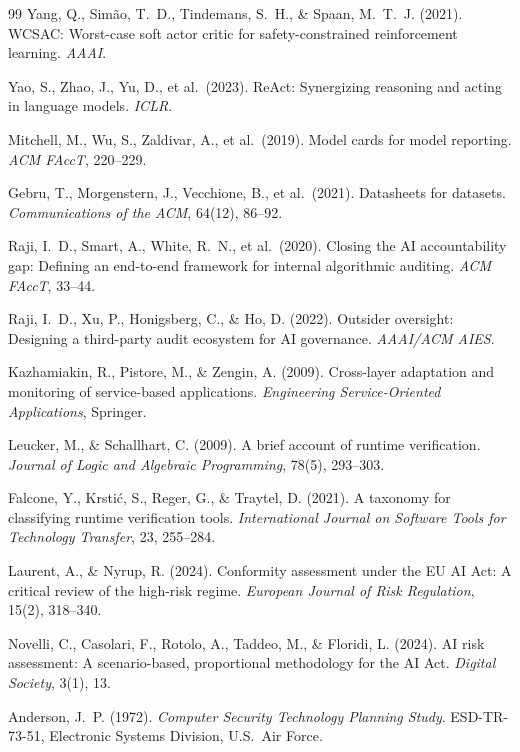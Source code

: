 \documentclass[11pt,a4paper]{article}
\theoremstyle{remark}
\begin{document}
\begin{thebibliography}{99}
Yang, Q., Simão, T.~D., Tindemans, S.~H., \& Spaan, M.~T.~J. (2021). WCSAC: Worst-case soft actor critic for safety-constrained reinforcement learning. \textit{AAAI}.

Yao, S., Zhao, J., Yu, D., et al.\ (2023). ReAct: Synergizing reasoning and acting in language models. \textit{ICLR}.

Mitchell, M., Wu, S., Zaldivar, A., et al.\ (2019). Model cards for model reporting. \textit{ACM FAccT}, 220--229.

Gebru, T., Morgenstern, J., Vecchione, B., et al.\ (2021). Datasheets for datasets. \textit{Communications of the ACM}, 64(12), 86--92.

Raji, I.~D., Smart, A., White, R.~N., et al.\ (2020). Closing the AI accountability gap: Defining an end-to-end framework for internal algorithmic auditing. \textit{ACM FAccT}, 33--44.

Raji, I.~D., Xu, P., Honigsberg, C., \& Ho, D. (2022). Outsider oversight: Designing a third-party audit ecosystem for AI governance. \textit{AAAI/ACM AIES}.

Kazhamiakin, R., Pistore, M., \& Zengin, A. (2009). Cross-layer adaptation and monitoring of service-based applications. \textit{Engineering Service-Oriented Applications}, Springer.

Leucker, M., \& Schallhart, C. (2009). A brief account of runtime verification. \textit{Journal of Logic and Algebraic Programming}, 78(5), 293--303.

Falcone, Y., Krsti\'c, S., Reger, G., \& Traytel, D. (2021). A taxonomy for classifying runtime verification tools. \textit{International Journal on Software Tools for Technology Transfer}, 23, 255--284.

Laurent, A., \& Nyrup, R. (2024). Conformity assessment under the EU AI Act: A critical review of the high-risk regime. \textit{European Journal of Risk Regulation}, 15(2), 318--340.

Novelli, C., Casolari, F., Rotolo, A., Taddeo, M., \& Floridi, L. (2024). AI risk assessment: A scenario-based, proportional methodology for the AI Act. \textit{Digital Society}, 3(1), 13.

Anderson, J.~P. (1972). \textit{Computer Security Technology Planning Study}. ESD-TR-73-51, Electronic Systems Division, U.S.\ Air Force.


\end{thebibliography}
\end{document}
